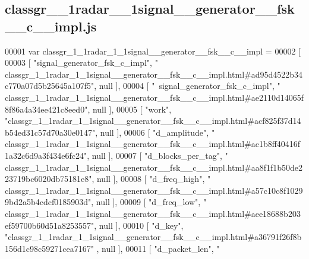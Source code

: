 \subsection{classgr\+\_\+\_\+1radar\+\_\+\_\+1signal\+\_\+\+\_\+generator\+\_\+\+\_\+fsk\+\_\+\+\_\+c\+\_\+\+\_\+impl.\+js}
\label{classgr__1__1radar__1__1signal____generator____fsk____c____impl_8js_source}

\begin{DoxyCode}
00001 var classgr_1_1radar_1_1signal__generator__fsk__c__impl =
00002 [
00003     [ \textcolor{stringliteral}{"signal\_generator\_fsk\_c\_impl"}, \textcolor{stringliteral}{"
      classgr\_1\_1radar\_1\_1signal\_\_generator\_\_fsk\_\_c\_\_impl.html#ad95d4522b34c770a07d5b25645a107f5"}, null ],
00004     [ \textcolor{stringliteral}{"~signal\_generator\_fsk\_c\_impl"}, \textcolor{stringliteral}{"
      classgr\_1\_1radar\_1\_1signal\_\_generator\_\_fsk\_\_c\_\_impl.html#ae2110d14065f8f86a4a34ee421c8eed0"}, null ],
00005     [ \textcolor{stringliteral}{"work"}, \textcolor{stringliteral}{"classgr\_1\_1radar\_1\_1signal\_\_generator\_\_fsk\_\_c\_\_impl.html#acf825f37d14b54ed31c57d70a30e0147"},
       null ],
00006     [ \textcolor{stringliteral}{"d\_amplitude"}, \textcolor{stringliteral}{"
      classgr\_1\_1radar\_1\_1signal\_\_generator\_\_fsk\_\_c\_\_impl.html#ac1b8ff40416f1a32c6d9a3f434e6fc24"}, null ],
00007     [ \textcolor{stringliteral}{"d\_blocks\_per\_tag"}, \textcolor{stringliteral}{"
      classgr\_1\_1radar\_1\_1signal\_\_generator\_\_fsk\_\_c\_\_impl.html#aa8f1f1b50de223719bc6020db75181e8"}, null ],
00008     [ \textcolor{stringliteral}{"d\_freq\_high"}, \textcolor{stringliteral}{"
      classgr\_1\_1radar\_1\_1signal\_\_generator\_\_fsk\_\_c\_\_impl.html#a57c10c8f10299bd2a5b4cdcf0185903d"}, null ],
00009     [ \textcolor{stringliteral}{"d\_freq\_low"}, \textcolor{stringliteral}{"
      classgr\_1\_1radar\_1\_1signal\_\_generator\_\_fsk\_\_c\_\_impl.html#aee18688b203ef59700b60d51a8253557"}, null ],
00010     [ \textcolor{stringliteral}{"d\_key"}, \textcolor{stringliteral}{"classgr\_1\_1radar\_1\_1signal\_\_generator\_\_fsk\_\_c\_\_impl.html#a36791f26f8b156d1c98c59271cea7167"}
      , null ],
00011     [ \textcolor{stringliteral}{"d\_packet\_len"}, \textcolor{stringliteral}{"
}
\end{DoxyCode}
